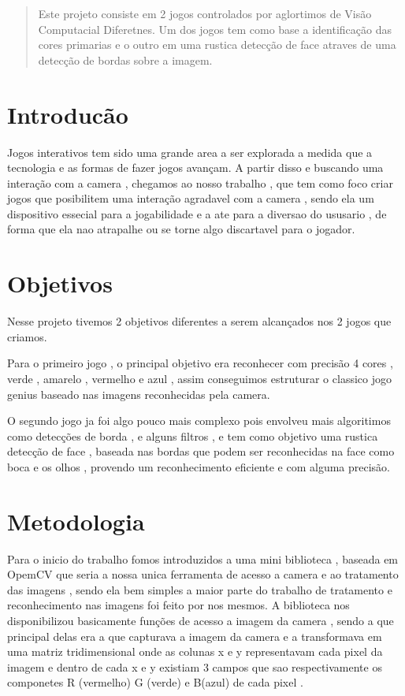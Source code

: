 \documentclass{sciposter}
\begin{document}
\begin{multicols}{3}

\begin{abstract}
Este projeto consiste em 2 jogos controlados por aglortimos de Visão Computacial  Diferetnes. Um dos jogos tem como base a identificação das cores primarias e o outro em uma rustica detecção de face atraves de uma detecção de bordas sobre a imagem.

\end{abstract}

\section{Introducão}
Jogos interativos tem sido uma grande area a ser explorada a medida que a tecnologia e as formas de fazer jogos avançam. A partir disso e buscando uma interação com a camera , chegamos ao nosso 
trabalho ,  que tem como foco criar jogos que posibilitem uma interação agradavel com a camera , sendo ela um dispositivo essecial para a jogabilidade e a ate para a diversao do ususario , de forma que ela nao atrapalhe ou se torne algo discartavel para o jogador.

\newcommand{\imsize}{0.45\columnwidth}




\section{Objetivos}
Nesse projeto tivemos 2 objetivos diferentes a serem alcançados nos 2 jogos que criamos. 

Para o primeiro jogo , o principal objetivo era reconhecer com precisão 4 cores , verde , amarelo , vermelho e azul , assim conseguimos estruturar o classico jogo genius baseado nas imagens reconhecidas pela camera.

O segundo jogo ja foi algo pouco mais complexo pois envolveu mais algoritimos como detecções de borda , e alguns filtros , e tem como objetivo uma rustica detecção de face , baseada nas bordas 
que podem ser reconhecidas na face como boca e os olhos , provendo um reconhecimento eficiente e com alguma precisão.

\section{Metodologia}
Para o inicio do trabalho fomos introduzidos a uma mini biblioteca , baseada em OpemCV que seria a nossa unica ferramenta de acesso a camera e ao tratamento das imagens , sendo ela bem simples
a maior parte do trabalho de tratamento e reconhecimento nas imagens foi feito por nos mesmos. A biblioteca nos disponibilizou basicamente funções de acesso a imagem da camera , sendo a que
principal delas era a que capturava a imagem da camera e a transformava em uma matriz tridimensional onde as colunas x e y representavam cada pixel da imagem e dentro de cada x e y existiam 3 
campos que sao respectivamente os componetes R (vermelho) G (verde) e B(azul) de cada pixel .


\end{multicols}
\end{document}
